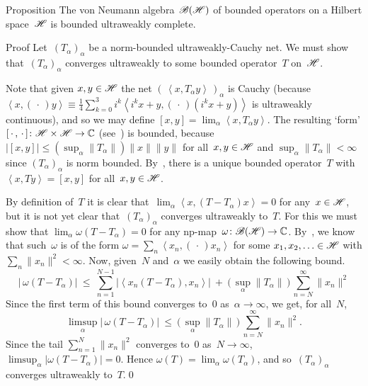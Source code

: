 \documentclass[a]{subfiles}
\begin{document}
\begin{parsec}%
\begin{point}{Proposition}%
The von Neumann algebra~$\mathscr{B}(\mathscr{H})$
of bounded operators on a Hilbert space~$\mathscr{H}$
is bounded ultraweakly complete.
\begin{point}{Proof}%
Let~$(T_\alpha)_\alpha$ be a norm-bounded ultraweakly-Cauchy net.
We must show that~$(T_\alpha)_\alpha$
converges ultraweakly
to some bounded operator~$T$ on~$\mathscr{H}$.

Note that given $x,y\in\mathscr{H}$
the net $(\,\left<x,T_\alpha y\right>\,)_\alpha$
is Cauchy
(because $\left<x,(\,\cdot\,)y\right>
\equiv \frac{1}{4}\sum_{k=0}^3 i^k\left<i^kx+y,(\,\cdot\,)(i^kx+y)\right>$
is ultraweakly continuous),
and so we may define $[x,y] = \lim_\alpha \left<x,T_\alpha y\right>$.
The resulting `form'
$[\,\cdot\,,\,\cdot\,]\colon \mathscr{H}\times\mathscr{H}\to \mathbb{C}$
(see~)
is bounded, 
because~$\left|[x,y]\right| \leq (\sup_\alpha \|T_\alpha\|)\|x\|\|y\|$
for all~$x,y\in\mathscr{H}$
and $\sup_\alpha\|T_\alpha\|<\infty$
since $(T_\alpha)_\alpha$
is norm bounded.
By~,
there is a unique bounded operator~$T$
with $\left<x,Ty\right>=[x,y]$
for all~$x,y\in\mathscr{H}$.

By definition of~$T$ it is clear 
that~$\lim_\alpha \left<x,(T-T_\alpha)x\right>=0$
for any~$x\in\mathscr{H}$,
but it is not yet clear that~$(T_\alpha)_\alpha$ converges ultraweakly to~$T$.
For this we must show that $\lim_\alpha \omega(T-T_\alpha)=0$
for any np-map~$\omega\colon \mathscr{B}(\mathscr{H})\to \mathbb{C}$.
By~,
we know that such~$\omega$ is of the form
$\omega=\sum_n \left<x_n,(\,\cdot\,)x_n\right>$
for some $x_1,x_2,\dotsc\in\mathscr{H}$ with $\sum_n\|x_n\|^2<\infty$.
Now, given~$N$ and~$\alpha$ we easily obtain the 
following bound.
\begin{equation*}
	|\,\omega(T-T_\alpha)| \ \leq\  
	\sum_{n=1}^{N-1} \left|\left<x_n(T-T_\alpha),x_n\right>\right|
\ +\ \bigl(\,\sup_\alpha\|T_\alpha\|\,\bigr)\,\sum_{n=N}^\infty \|x_n\|^2 
\end{equation*}
Since the first term of this bound converges to~$0$ as~$\alpha\to\infty$,
we get, for all~$N$,
\begin{equation*}
	\limsup_\alpha |\,\omega(T-T_\alpha)| \ \leq\ 
	\bigl(\,\sup_\alpha\|T_\alpha\|\,\bigr)\,\sum_{n=N}^\infty \|x_n\|^2.
\end{equation*}
Since the tail $\sum_{n=1}^N\|x_n\|^2$
converges to~$0$ as~$N\to \infty$,
$\limsup_\alpha \left|\omega(T-T_\alpha)\right|=0$.
Hence $\omega(T)=\lim_\alpha \omega(T_\alpha)$,
and so~$(T_\alpha)_\alpha$ converges ultraweakly to~$T$.\qed
\end{point}
\end{point}
\end{parsec}
\end{document}

